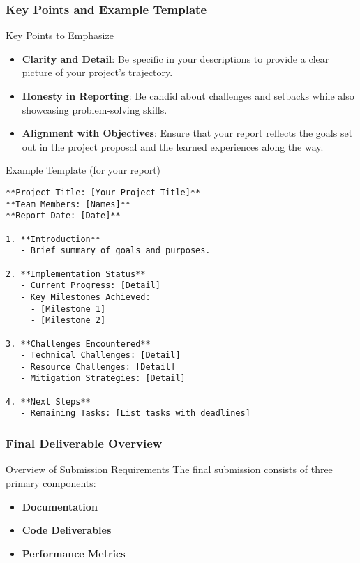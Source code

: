 \documentclass[aspectratio=169]{beamer}
\begin{document}
\begin{frame}[fragile]
    \frametitle{Key Points and Example Template}
    \begin{block}{Key Points to Emphasize}
        \begin{itemize}
            \item \textbf{Clarity and Detail}: Be specific in your descriptions to provide a clear picture of your project’s trajectory.
            \item \textbf{Honesty in Reporting}: Be candid about challenges and setbacks while also showcasing problem-solving skills.
            \item \textbf{Alignment with Objectives}: Ensure that your report reflects the goals set out in the project proposal and the learned experiences along the way.
        \end{itemize}
    \end{block}
    
    \begin{block}{Example Template (for your report)}
        \begin{verbatim}
**Project Title: [Your Project Title]**  
**Team Members: [Names]**  
**Report Date: [Date]**

1. **Introduction**  
   - Brief summary of goals and purposes.

2. **Implementation Status**  
   - Current Progress: [Detail]
   - Key Milestones Achieved: 
     - [Milestone 1]
     - [Milestone 2]

3. **Challenges Encountered**  
   - Technical Challenges: [Detail]
   - Resource Challenges: [Detail]
   - Mitigation Strategies: [Detail]

4. **Next Steps**  
   - Remaining Tasks: [List tasks with deadlines]
        \end{verbatim}
    \end{block}
\end{frame}

\begin{frame}
    \frametitle{Final Deliverable Overview}
    \begin{block}{Overview of Submission Requirements}
        The final submission consists of three primary components:
        \begin{itemize}
            \item \textbf{Documentation}
            \item \textbf{Code Deliverables}
            \item \textbf{Performance Metrics}
        \end{itemize}
    \end{block}
\end{frame}
\end{document}
